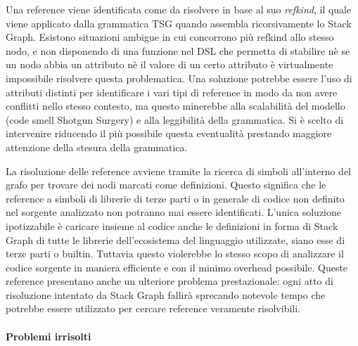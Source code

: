 
Una reference viene identificata come da risolvere in base al suo \emph{refkind}, il quale viene applicato dalla grammatica TSG quando assembla ricorsivamente lo Stack Graph. Esistono situazioni ambigue in cui concorrono pi\`u refkind allo stesso nodo, e non disponendo di una funzione nel DSL che permetta di stabilire n\`e se un nodo abbia un attributo n\`e il valore di un certo attributo \`e virtualmente impossibile risolvere questa problematica. Una soluzione potrebbe essere l'uso di attributi distinti per identificare i vari tipi di reference in modo da non avere conflitti nello stesso contesto, ma questo minerebbe alla scalabilit\`a del modello (code smell Shotgun Surgery) e alla leggibilit\`a della grammatica. Si \`e scelto di intervenire riducendo il pi\`u possibile questa eventualit\`a prestando maggiore attenzione della stesura della grammatica.


La risoluzione delle reference avviene tramite la ricerca di simboli all'interno del grafo per trovare dei nodi marcati come definizioni. Questo significa che le reference a simboli di librerie di terze parti o in generale di codice non definito nel sorgente analizzato non potranno mai essere identificati. L'unica soluzione ipotizzabile \`e caricare insieme al codice anche le definizioni in forma di Stack Graph di tutte le librerie dell'ecosistema del linguaggio utilizzate, siano esse di terze parti o builtin. Tuttavia questo violerebbe lo stesso scopo di analizzare il codice sorgente in maniera efficiente e con il minimo overhead possibile. Queste reference presentano anche un ulteriore problema prestazionale: ogni atto di risoluzione intentato da Stack Graph fallir\`a sprecando notevole tempo che potrebbe essere utilizzato per cercare reference veramente risolvibili.

\paragraph{Problemi irrisolti}


